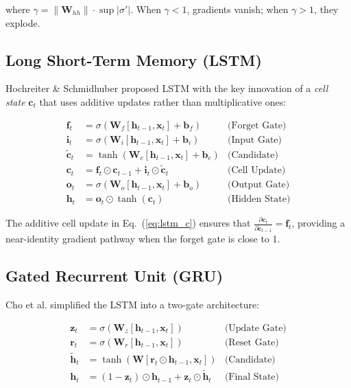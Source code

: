 \documentclass[12pt, a4paper]{article}
\begin{document}
where $\gamma = \|\mathbf{W}_{hh}\| \cdot \sup|\sigma'|$. When $\gamma < 1$, gradients vanish; when $\gamma > 1$, they explode.

\subsection{Long Short-Term Memory (LSTM)}

Hochreiter \& Schmidhuber \cite{hochreiter1997} proposed LSTM with the key innovation of a \textit{cell state} $\mathbf{c}_t$ that uses additive updates rather than multiplicative ones:

\begin{align}
    \mathbf{f}_t &= \sigma(\mathbf{W}_f [\mathbf{h}_{t-1}, \mathbf{x}_t] + \mathbf{b}_f) & \text{(Forget Gate)} \label{eq:lstm_f}\\
    \mathbf{i}_t &= \sigma(\mathbf{W}_i [\mathbf{h}_{t-1}, \mathbf{x}_t] + \mathbf{b}_i) & \text{(Input Gate)} \label{eq:lstm_i}\\
    \tilde{\mathbf{c}}_t &= \tanh(\mathbf{W}_c [\mathbf{h}_{t-1}, \mathbf{x}_t] + \mathbf{b}_c) & \text{(Candidate)} \label{eq:lstm_ct}\\
    \mathbf{c}_t &= \mathbf{f}_t \odot \mathbf{c}_{t-1} + \mathbf{i}_t \odot \tilde{\mathbf{c}}_t & \text{(Cell Update)} \label{eq:lstm_c}\\
    \mathbf{o}_t &= \sigma(\mathbf{W}_o [\mathbf{h}_{t-1}, \mathbf{x}_t] + \mathbf{b}_o) & \text{(Output Gate)} \label{eq:lstm_o}\\
    \mathbf{h}_t &= \mathbf{o}_t \odot \tanh(\mathbf{c}_t) & \text{(Hidden State)} \label{eq:lstm_h}
\end{align}

The additive cell update in Eq.~(\ref{eq:lstm_c}) ensures that $\frac{\partial \mathbf{c}_t}{\partial \mathbf{c}_{t-1}} = \mathbf{f}_t$, providing a near-identity gradient pathway when the forget gate is close to 1.

\subsection{Gated Recurrent Unit (GRU)}

Cho et al. \cite{cho2014} simplified the LSTM into a two-gate architecture:

\begin{align}
    \mathbf{z}_t &= \sigma(\mathbf{W}_z [\mathbf{h}_{t-1}, \mathbf{x}_t]) & \text{(Update Gate)} \label{eq:gru_z}\\
    \mathbf{r}_t &= \sigma(\mathbf{W}_r [\mathbf{h}_{t-1}, \mathbf{x}_t]) & \text{(Reset Gate)} \label{eq:gru_r}\\
    \tilde{\mathbf{h}}_t &= \tanh(\mathbf{W} [\mathbf{r}_t \odot \mathbf{h}_{t-1}, \mathbf{x}_t]) & \text{(Candidate)} \label{eq:gru_h}\\
    \mathbf{h}_t &= (1 - \mathbf{z}_t) \odot \mathbf{h}_{t-1} + \mathbf{z}_t \odot \tilde{\mathbf{h}}_t & \text{(Final State)} \label{eq:gru_final}
\end{align}
\end{document}
